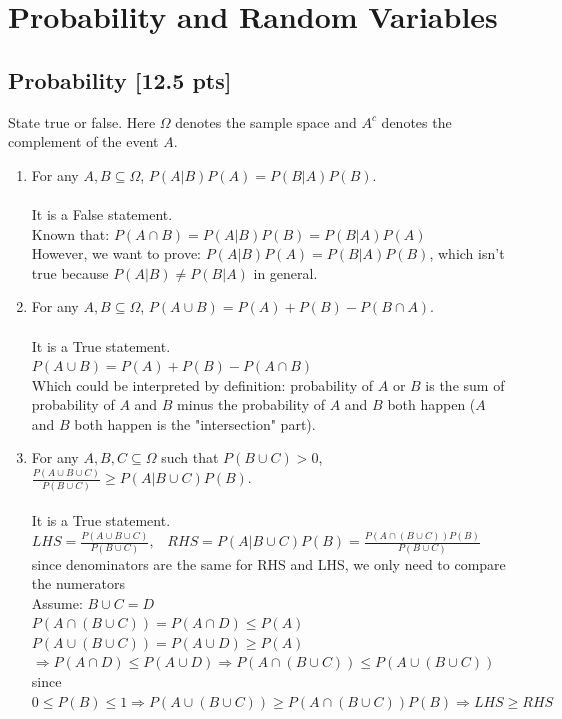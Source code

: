 \documentclass[a4paper]{article}
\theoremstyle{definition}
\newenvironment{soln}{
	\leavevmode\color{blue}\ignorespaces
}{}
\begin{document}
	
	
	
	
	\section{Probability and Random Variables }
	\subsection{Probability [12.5 pts]}
	State true or false. Here $\Omega$ denotes the sample space and $A^c$ denotes the complement of the event $A$.
	\begin{enumerate}
		\item For any $A, B \subseteq \Omega$, $P(A|B)P(A) = P(B|A)P(B)$.\\
		\begin{soln}\\
			It is a False statement. \\
		Known that: $P(A \cap B) = P(A|B) P(B) = P(B|A) P(A)$ \\
		However, we want to prove: $P(A|B)P(A) = P(B|A)P(B)$, which isn't true because $P(A|B) \neq P(B|A)$ in general.\\
		\end{soln}
		
		\item For any $A, B \subseteq \Omega$, $P(A \cup B) = P(A) + P(B) - P(B \cap A)$.\\         
		\begin{soln}\\
			It is a True statement. \\
		$P(A \cup B) = P(A) + P(B) - P(A \cap B)$\\
		Which could be interpreted by definition: probability of $A$ or $B$ is the sum of probability of $A$ and $B$ minus the probability of $A$ and $B$ both happen ($A$ and $B$ both happen is the "intersection" part).
		\end{soln}
		
		\item For any $A, B, C \subseteq \Omega$ such that $P(B \cup C) > 0$,
		$\frac{P(A \cup B \cup C)}{P(B \cup C)} \geq P(A | B \cup C) P(B)$.\\ 
		\begin{soln}\\
		It is a True statement. \\
		$LHS = \frac{P(A \cup B \cup C)}{P(B \cup C)}, \;\;\; RHS = P(A|B \cup C) P(B) =\frac{P(A \cap (B \cup C)) P(B)}{P(B \cup C)}\;\;$ since denominators are the same for RHS and LHS, we only need to compare the numerators\\
		Assume: $B \cup C = D$\\
		$P(A \cap (B \cup C)) = P(A \cap D) \leq P(A)$\\
		$P(A \cup (B \cup C)) = P(A \cup D) \geq P(A)$\\
		$\Rightarrow P(A \cap D) \leq P(A \cup D) \Rightarrow P(A \cap (B \cup C)) \leq P(A \cup (B \cup C))$\\
		since $0 \leq P(B) \leq 1 \Rightarrow P(A \cup (B \cup C)) \geq P(A \cap (B \cup C)) P(B)\Rightarrow LHS \geq RHS$\\
		\end{soln}
		

\end{enumerate}
\end{document}
